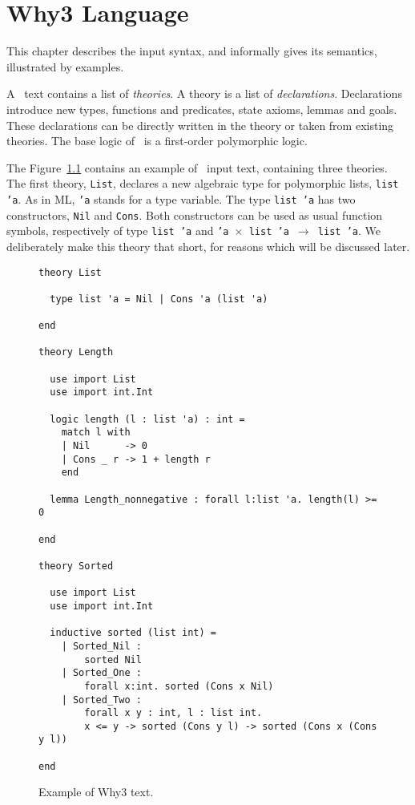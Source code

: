 \chapter{Why3 Language}
\label{chap:syntax}

This chapter describes the input syntax, and informally gives its semantics,
illustrated by examples.

A \why\ text contains a list of \emph{theories}. 
A theory is a list of \emph{declarations}. Declarations introduce new
types, functions and predicates, state axioms, lemmas and goals. 
These declarations can be directly written in the theory or taken from
existing theories. The base logic of \why\ is a first-order
polymorphic logic.

The Figure~\ref{fig:tutorial1} contains an example of \why\ input
text, containing three theories. The first theory, \texttt{List}, 
declares a new algebraic type for polymorphic lists, \texttt{list 'a}.
As in ML, \texttt{'a} stands for a type variable.
The type \texttt{list 'a} has two constructors, \texttt{Nil} and
\texttt{Cons}. Both constructors can be used as usual function
symbols, respectively of type \texttt{list 'a} and \texttt{'a
  $\times$ list 'a $\rightarrow$ list 'a}.
We deliberately make this theory that short, for reasons which will be
discussed later.

\begin{figure}
  \centering
\begin{verbatim}
theory List

  type list 'a = Nil | Cons 'a (list 'a)

end

theory Length

  use import List
  use import int.Int

  logic length (l : list 'a) : int = 
    match l with
    | Nil      -> 0
    | Cons _ r -> 1 + length r
    end

  lemma Length_nonnegative : forall l:list 'a. length(l) >= 0

end

theory Sorted

  use import List
  use import int.Int
 
  inductive sorted (list int) =
    | Sorted_Nil : 
        sorted Nil
    | Sorted_One : 
        forall x:int. sorted (Cons x Nil)
    | Sorted_Two : 
        forall x y : int, l : list int. 
        x <= y -> sorted (Cons y l) -> sorted (Cons x (Cons y l))
 
end
\end{verbatim}
\caption{Example of Why3 text.}
\label{fig:tutorial1}
\end{figure}

